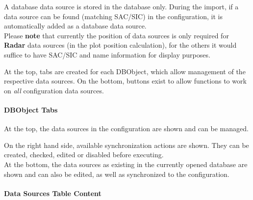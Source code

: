 A database data source is stored in the database only. During the import, if a data source can be found (matching SAC/SIC) in the configuration, it is automatically added as a database data source. \\

Please \textbf{note} that currently the position of data sources is only required for \textbf{Radar} data sources (in the plot position calculation), for the others it would suffice to have SAC/SIC and name information for display purposes.

At the top, tabs are created for each DBObject, which allow management of the respective data sources. On the bottom, buttons exist to allow functions to work on \textit{all} configuration data sources.

\paragraph {DBObject Tabs}

At the top, the data sources in the configuration are shown and can be managed. 

On the right hand side, available synchronization actions are shown. They can be created, checked, edited or disabled before executing. \\

At the bottom, the data sources as existing in the currently opened database are shown and can also be edited, as well as synchronized to the configuration. \\

\paragraph {Data Sources Table Content}
\label{sec:task_manage_datasources_table_content}

